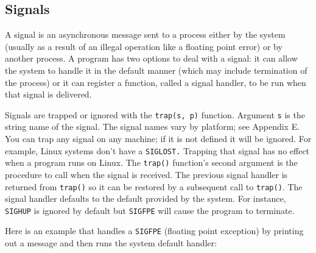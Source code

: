 \subsection{Signals}

A signal is an asynchronous message sent to a process either by
the system (usually as a result of an illegal operation like a
floating point error) or by another process. A
program has two options to deal with a signal: it can allow the system to handle
it in the default manner (which may include termination of the process) or it
can register a function, called a signal handler, to be run when that signal is
delivered.

Signals are trapped or ignored with the \texttt{trap(s, p)} function.  Argument
\texttt{s} is the string name of the signal. The signal names vary by platform;
see Appendix E. You can trap any signal on any machine; if it is not defined it
will be ignored. For example, Linux systems don't have a \texttt{SIGLOST.}
Trapping that signal has no effect when a program runs on Linux. The
\texttt{trap()} function's second argument is the procedure to call when the
signal is received. The previous signal handler is returned from
\texttt{trap()} so it can be restored by a subsequent call to
\texttt{trap()}. The signal handler defaults to the default provided by the
system. For instance, \texttt{SIGHUP} is ignored by default but \texttt{SIGFPE}
will cause the program to terminate.

Here is an example that handles a \texttt{SIGFPE} (floating point exception) by
printing out a message and then runs the system default handler:


